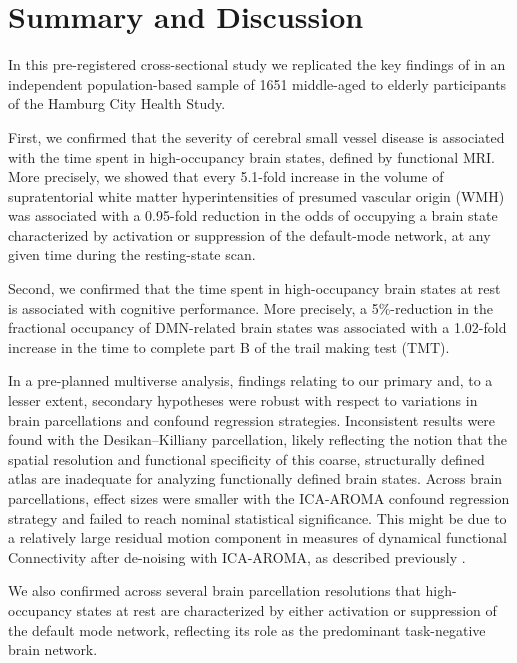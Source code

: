 \section{Summary and Discussion} \label{discussion}

In this pre-registered cross-sectional study we replicated the key findings of \cite{Schlemm2022-he} in an independent population-based sample of \num{1651} middle-aged to elderly participants of the Hamburg City Health Study.

First, we confirmed that the severity of cerebral small vessel disease is associated with the time spent in high-occupancy brain states, deﬁned by functional MRI.
More precisely, we showed that every 5.1-fold increase in the volume of supratentorial white matter hyperintensities of presumed vascular origin (WMH) was associated with a 0.95-fold reduction in the odds of occupying a brain state characterized by activation or suppression of the default-mode network, at any given time during the resting-state scan.

Second, we confirmed that the time spent in high-occupancy brain states at rest is associated with cognitive performance. 
More precisely, a 5\%-reduction in the fractional occupancy of DMN-related brain states was associated with a \num{1.02}-fold increase in the time to complete part B of the trail making test (TMT).

In a pre-planned multiverse analysis, findings relating to our primary and, to a lesser extent, secondary hypotheses were robust with respect to variations in brain parcellations and confound regression strategies. Inconsistent results were found with the Desikan--Killiany parcellation, likely reflecting the notion that the spatial resolution and functional specificity of this coarse, structurally defined atlas are inadequate for analyzing functionally defined brain states.  Across brain parcellations, effect sizes  were smaller with the ICA-AROMA confound regression strategy and failed to reach nominal statistical significance. This might be due to a relatively large residual motion component in measures of dynamical functional Connectivity after de-noising with ICA-AROMA, as described previously \citep{lydon2019evaluation}.

We also confirmed across several brain parcellation resolutions that high-occupancy states at rest are characterized by either activation or suppression of the default mode network, reflecting its role as the predominant task-negative brain network.

